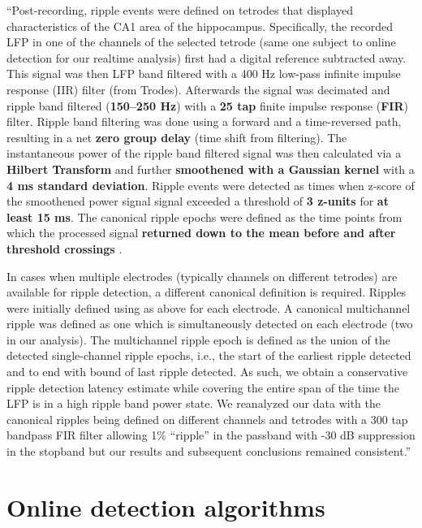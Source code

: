\begin{quotebar}
``Post-recording, ripple events were defined on tetrodes that displayed characteristics of the CA1 area of the hippocampus. Specifically, the recorded LFP in one of the channels of the selected tetrode (same one subject to online detection for our realtime analysis) first had a digital reference subtracted away. This signal was then LFP band filtered with a 400 Hz low-pass infinite impulse response (IIR) filter (from Trodes). Afterwards the signal was decimated and ripple band filtered (\textbf{150–250 Hz}) with a \textbf{25 tap} finite impulse response (\textbf{FIR}) filter. Ripple band filtering was done using a forward and a time-reversed path, resulting in a net \textbf{zero group delay} (time shift from filtering). The instantaneous power of the ripple band filtered signal was then calculated via a \textbf{Hilbert Transform} and further \textbf{smoothened with a Gaussian kernel} with a \textbf{4 ms standard deviation}. Ripple events were detected as times when z-score of the smoothened power signal signal exceeded a threshold of \textbf{3 z-units} for \textbf{at least 15 ms}. The canonical ripple epochs were defined as the time points from which the processed signal \textbf{returned down to the mean before and after threshold crossings} \cite{Cheng2008,Kemere2013}.

In cases when multiple electrodes (typically channels on different tetrodes) are available for ripple detection, a different canonical definition is required. Ripples were initially defined using as above for each electrode. A canonical multichannel ripple was defined as one which is simultaneously detected on each electrode (two in our analysis). The multichannel ripple epoch is defined as the union of the detected single-channel ripple epochs, i.e., the start of the earliest ripple detected and to end with bound of last ripple detected. As such, we obtain a conservative ripple detection latency estimate while covering the entire span of the time the LFP is in a high ripple band power state. We reanalyzed our data with the canonical ripples being defined on different channels and tetrodes with a 300 tap bandpass FIR filter allowing 1\% “ripple” in the passband with -30 dB suppression in the stopband but our results and subsequent conclusions remained consistent.'' \cite{Dutta2018}
\end{quotebar}





\clearpage
\section{Online detection algorithms}
\label{apx:online-detection-algos}

